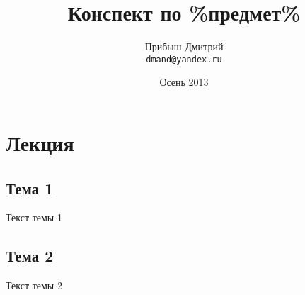 \documentclass[a4paper,12pt]{report}
\author{Прибыш Дмитрий\\
  \texttt{dmand@yandex.ru}}
\title{Конспект по \%предмет\%}
\date{Осень 2013}
\newcommand{\lecture}{\chapter}
\begin{document}
\maketitle
\tableofcontents
\lecture{Лекция}
\section{Тема 1}
Текст темы 1
\section{Тема 2}
Текст темы 2
\end{document}
